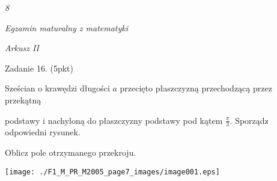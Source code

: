 \documentclass[a4paper,12pt]{article}
\begin{document}
{\it 8}

{\it Egzamin maturalny z matematyki}

{\it Arkusz II}

Zadanie 16. (5pkt)

Sześcian o krawędzi długości $a$ przecięto płaszczyzną przechodzącą przez przekątną

podstawy i nachyloną do płaszczyzny podstawy pod kątem $\displaystyle \frac{\pi}{3}$. Sporządz$\acute{}$ odpowiedni rysunek.

Oblicz pole otrzymanego przekroju.
\begin{center}
\texttt{[image: ./F1\_M\_PR\_M2005\_page7\_images/image001.eps]}
\end{center}
\end{document}
